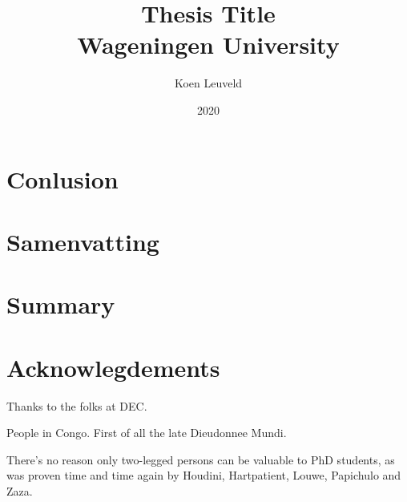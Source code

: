 \documentclass[12pt]{report}
\begin{document}

\title{
	{Thesis Title}\\
	{\large Wageningen University}\\
}
\author{Koen Leuveld}
\date{2020}
\maketitle



\tableofcontents




 



\chapter{Conlusion}


\clearpage
\chapter{Samenvatting}


\clearpage
\chapter{Summary}



\chapter{Acknowlegdements}

Thanks to the folks at DEC.

People in Congo. First of all the late Dieudonnee Mundi.

There's no reason only two-legged persons can be valuable to PhD students, as was proven time and time again by Houdini, Hartpatient, Louwe, Papichulo and Zaza.




\end{document}
